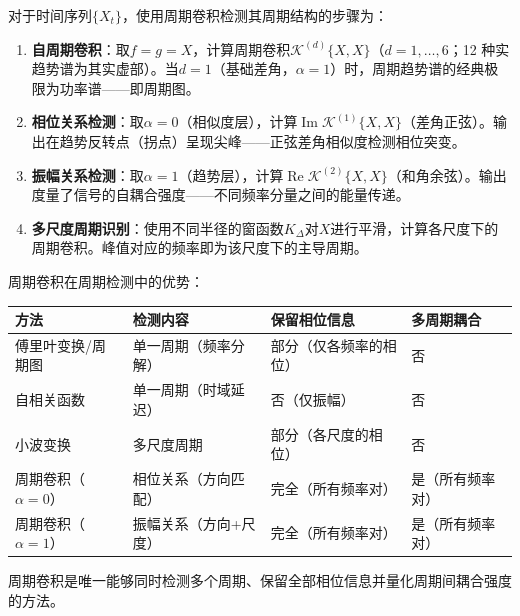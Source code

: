 \begin{definition}[基于周期卷积的周期检测]\label{def:periodic_transform_detection}
对于时间序列$\{X_t\}$，使用周期卷积检测其周期结构的步骤为：
\begin{enumerate}[label=(\roman*)]
    \item \textbf{自周期卷积}：取$f = g = X$，计算周期卷积$\mathcal{K}^{(d)}\{X, X\}$（$d=1,\dots,6$；12 种实趋势谱为其实虚部）。当$d=1$（基础差角，$\alpha=1$）时，周期趋势谱的经典极限为功率谱——即周期图。
    \item \textbf{相位关系检测}：取$\alpha=0$（相似度层），计算$\operatorname{Im}\mathcal{K}^{(1)}\{X, X\}$（差角正弦）。输出在趋势反转点（拐点）呈现尖峰——正弦差角相似度检测相位突变。
    \item \textbf{振幅关系检测}：取$\alpha=1$（趋势层），计算$\operatorname{Re}\mathcal{K}^{(2)}\{X, X\}$（和角余弦）。输出度量了信号的自耦合强度——不同频率分量之间的能量传递。
    \item \textbf{多尺度周期识别}：使用不同半径的窗函数$K_\Delta$对$X$进行平滑，计算各尺度下的周期卷积。峰值对应的频率即为该尺度下的主导周期。
\end{enumerate}
\end{definition}

\begin{proposition}[周期卷积与经典方法的比较]\label{prop:periodic_transform_vs_classical}
周期卷积在周期检测中的优势：
\begin{center}
\begin{tabular}{>{\centering\arraybackslash}p{2.5cm}>{\centering\arraybackslash}p{3cm}>{\centering\arraybackslash}p{3cm}>{\centering\arraybackslash}p{3cm}}
\toprule
方法 & 检测内容 & 保留相位信息 & 多周期耦合 \\
\midrule
傅里叶变换/周期图 & 单一周期（频率分解） & 部分（仅各频率的相位） & 否 \\
自相关函数 & 单一周期（时域延迟） & 否（仅振幅） & 否 \\
小波变换 & 多尺度周期 & 部分（各尺度的相位） & 否 \\
周期卷积（$\alpha=0$） & 相位关系（方向匹配） & 完全（所有频率对） & 是（所有频率对） \\
周期卷积（$\alpha=1$） & 振幅关系（方向+尺度） & 完全（所有频率对） & 是（所有频率对） \\
\bottomrule
\end{tabular}
\end{center}
周期卷积是唯一能够同时检测多个周期、保留全部相位信息并量化周期间耦合强度的方法。
\end{proposition}

